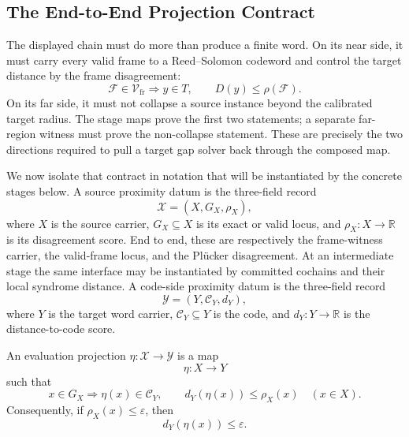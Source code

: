 \subsection{The End-to-End Projection Contract}

The displayed chain must do more than produce a finite word.  On its near
side, it must carry every valid frame to a Reed--Solomon codeword and control
the target distance by the frame disagreement:
\[
  \mathcal F\in\mathcal V_{\mathrm{fr}}
  \Longrightarrow y\in T,
  \qquad
  D(y)\le \rho(\mathcal F).
\]
On its far side, it must not collapse a source instance beyond the calibrated
target radius.  The stage maps prove the first two statements; a separate
far-region witness must prove the non-collapse statement.  These are precisely
the two directions required to pull a target gap solver back through the
composed map.

We now isolate that contract in notation that will be instantiated by the
concrete stages below.  A source proximity datum is the three-field record
\[
  \mathcal X=(X,G_X,\rho_X),
\]
where \(X\) is the source carrier, \(G_X\subseteq X\) is its exact or valid
locus, and \(\rho_X:X\to\mathbb R\) is its disagreement score.  End to end,
these are respectively the frame-witness carrier, the valid-frame locus, and
the Pl\"ucker disagreement.  At an intermediate stage the same interface may be
instantiated by committed cochains and their local syndrome distance.  A
code-side proximity datum is the three-field record
\[
  \mathcal Y=(Y,\mathcal C_Y,d_Y),
\]
where \(Y\) is the target word carrier, \(\mathcal C_Y\subseteq Y\) is
the code, and \(d_Y:Y\to\mathbb R\) is the distance-to-code score.

\begin{definition}\label{def:evaluation-projection}
An evaluation projection \(\eta:\mathcal X\to\mathcal Y\) is a map
\[
  \eta:X\longrightarrow Y
\]
such that
\[
  x\in G_X\Longrightarrow \eta(x)\in\mathcal C_Y,
  \qquad
  d_Y(\eta(x))\le \rho_X(x)
  \quad(x\in X).
\]
Consequently, if \(\rho_X(x)\le \varepsilon\), then
\[
  d_Y(\eta(x))\le \varepsilon.
\]
\end{definition}

